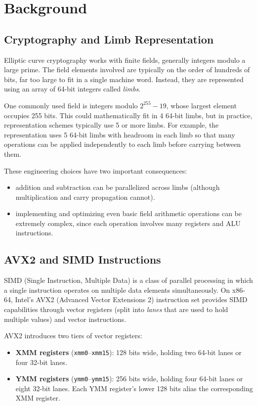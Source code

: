 \chapter{Background}
\label{ch:background}


\section{Cryptography and Limb Representation}

Elliptic curve cryptography works with finite fields, generally integers modulo a large prime. 
The field elements involved are typically on the order of hundreds of bits, far too large to fit in a single machine word.
Instead, they are represented using an array of 64-bit integers called \emph{limbs}.

One commonly used field is integers modulo $2^{255}-19$, whose largest element occupies 255 bits. 
This could mathematically fit in 4 64-bit limbs, but in practice, representation schemes typically use 5 or more limbs.
For example, the  representation uses 5 64-bit limbs with headroom in each limb so that many operations can be applied independently to each limb before carrying between them. 

These engineering choices have two important consequences: 
\begin{itemize}
    \item addition and subtraction can be parallelized across limbs (although multiplication and carry propagation cannot).
    \item implementing and optimizing even basic field arithmetic operations can be extremely complex, since each operation involves many registers and ALU instructions.
\end{itemize}

\section{AVX2 and SIMD Instructions}
\label{sec:avx-background}

SIMD (Single Instruction, Multiple Data) is a class of parallel processing in which a single instruction operates on multiple data elements simultaneously.
On x86-64, Intel's AVX2 (Advanced Vector Extensions 2) instruction set provides SIMD capabilities through vector registers (split into \textit{lanes} that are used to hold multiple values) and vector instructions.

AVX2 introduces two tiers of vector registers:
\begin{itemize}
    \item \textbf{XMM registers} (\texttt{xmm0}--\texttt{xmm15}): 128 bits wide, holding two 64-bit lanes or four 32-bit lanes.
    \item \textbf{YMM registers} (\texttt{ymm0}--\texttt{ymm15}): 256 bits wide, holding four 64-bit lanes or eight 32-bit lanes. Each YMM register's lower 128 bits alias the corresponding XMM register.
\end{itemize}

